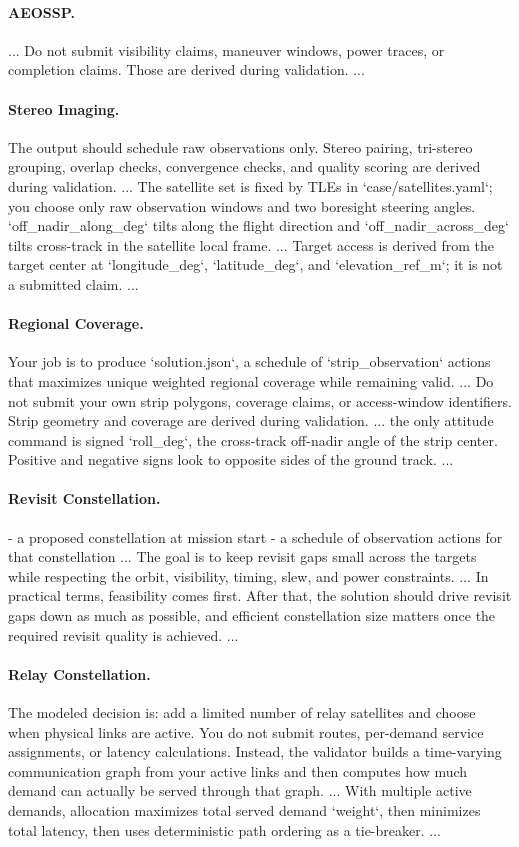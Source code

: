 \documentclass[11pt]{article}
\newenvironment{promptblockcompact}
  {\VerbatimEnvironment\par\smallskip\Needspace{6\baselineskip}\noindent\begin{promptblockinnercompact}}
  {\end{promptblockinnercompact}\par\smallskip}
\newcommand{\promptheadingcompact}[1]{\Needspace{4\baselineskip}\paragraph{#1}\mbox{}\par}
\begin{document}
\promptheadingcompact{AEOSSP.}
\begin{promptblockcompact}
...
Do not submit visibility claims, maneuver windows, power traces, or completion
claims.
Those are derived during validation.
...
\end{promptblockcompact}

\promptheadingcompact{Stereo Imaging.}
\begin{promptblockcompact}
The output should schedule raw observations only. Stereo pairing,
tri-stereo grouping, overlap checks, convergence checks, and quality scoring
are derived during validation.
...
The satellite set is fixed by TLEs in `case/satellites.yaml`; you choose only
raw observation windows and two boresight steering angles.
`off_nadir_along_deg` tilts along the flight direction and
`off_nadir_across_deg` tilts cross-track in the satellite local frame.
...
Target access is derived from the target center at `longitude_deg`,
`latitude_deg`, and `elevation_ref_m`; it is not a submitted claim.
...
\end{promptblockcompact}

\promptheadingcompact{Regional Coverage.}
\begin{promptblockcompact}
Your job is to produce `solution.json`, a schedule of `strip_observation`
actions that maximizes unique weighted regional coverage while remaining valid.
...
Do not submit your own strip polygons, coverage claims, or access-window
identifiers. Strip geometry and coverage are derived during validation.
...
the only attitude command is signed `roll_deg`, the cross-track off-nadir
angle of the strip center. Positive and negative signs look to opposite sides
of the ground track.
...
\end{promptblockcompact}

\promptheadingcompact{Revisit Constellation.}
\begin{promptblockcompact}
- a proposed constellation at mission start
- a schedule of observation actions for that constellation
...
The goal is to keep revisit gaps small across the targets while respecting the
orbit, visibility, timing, slew, and power constraints.
...
In practical terms, feasibility comes first. After that, the solution should
drive revisit gaps down as much as possible, and efficient constellation size
matters once the required revisit quality is achieved.
...
\end{promptblockcompact}

\promptheadingcompact{Relay Constellation.}
\begin{promptblockcompact}
The modeled decision is: add a limited number of relay satellites and choose
when physical links are active. You do not submit routes, per-demand service
assignments, or latency calculations. Instead, the validator builds a
time-varying communication graph from your active links and then computes how
much demand can actually be served through that graph.
...
With multiple active demands, allocation maximizes total served demand
`weight`, then minimizes total latency, then uses deterministic path ordering
as a tie-breaker.
...
\end{promptblockcompact}
\end{document}
